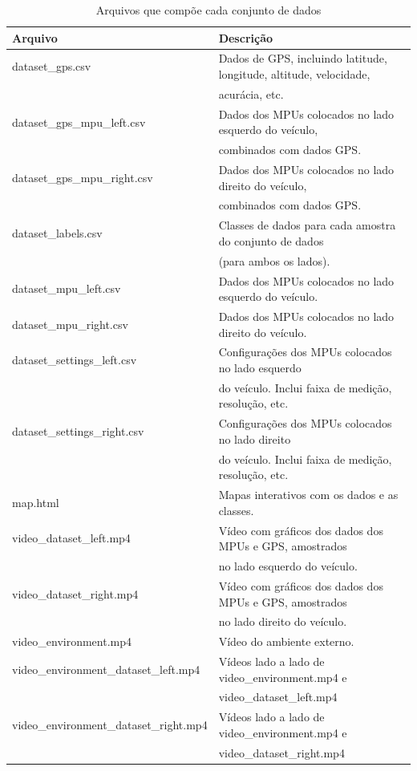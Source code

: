 \vspace{-1.1cm}

\begin{table}[H]
\small
\caption{Arquivos que compõe cada conjunto de dados} 
\label{table:conjuntos_arquivos}
\centering
\begin{tabular}{ll}
\toprule
\textbf{Arquivo} & \textbf{Descrição} \\ \midrule
dataset\_gps.csv & Dados de GPS, incluindo latitude, longitude, altitude, velocidade, \\ & acurácia, etc. \\ \midrule
dataset\_gps\_mpu\_left.csv & Dados dos MPUs colocados no lado esquerdo do veículo, \\ & combinados com dados GPS. \\ \midrule
dataset\_gps\_mpu\_right.csv & Dados dos MPUs colocados no lado direito do veículo, \\ & combinados com dados GPS. \\ \midrule
dataset\_labels.csv & Classes de dados para cada amostra do conjunto de dados \\ & (para ambos os lados). \\ \midrule
dataset\_mpu\_left.csv & Dados dos MPUs colocados no lado esquerdo do veículo. \\ \midrule
dataset\_mpu\_right.csv & Dados dos MPUs colocados no lado direito do veículo. \\ \midrule
dataset\_settings\_left.csv & Configurações dos MPUs colocados no lado esquerdo \\ & do veículo. Inclui faixa de medição, resolução, etc. \\ \midrule
dataset\_settings\_right.csv & Configurações dos MPUs colocados no lado direito \\ & do veículo. Inclui faixa de medição, resolução, etc. \\ \midrule
map.html & Mapas interativos com os dados e as classes. \\ \midrule
video\_dataset\_left.mp4 & Vídeo com gráficos dos dados dos MPUs e GPS, amostrados \\ & no lado esquerdo do veículo. \\ \midrule
video\_dataset\_right.mp4 & Vídeo com gráficos dos dados dos MPUs e GPS, amostrados \\ & no lado direito do veículo. \\ \midrule
video\_environment.mp4 & Vídeo do ambiente externo. \\ \midrule
video\_environment\_dataset\_left.mp4 & Vídeos lado a lado de video\_environment.mp4 e \\ & video\_dataset\_left.mp4 \\ \midrule
video\_environment\_dataset\_right.mp4 & Vídeos lado a lado de video\_environment.mp4 e \\ & video\_dataset\_right.mp4 \\ \bottomrule
\end{tabular}
\end{table}

